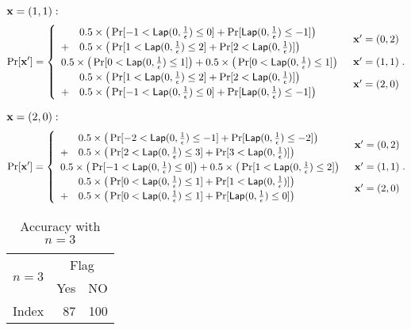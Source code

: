 \documentclass{article}
\begin{document}
\noindent $\textbf{x} = (1,1):$
\[
\Pr[\textbf{x}']
= \begin{cases}
\begin{array}{ll}
 	& 0.5 \times 
 	\big(
 	\Pr[	-1	< \mathsf{Lap}(0, \frac{1}{\epsilon})	\leq	0] 
 	+ 
 	\Pr[	\mathsf{Lap}(0, \frac{1}{\epsilon})			\leq	-1] 
 	\big) \\
 	+ 	
 	& 0.5 \times 
 	\big(
 	\Pr[	1	< \mathsf{Lap}(0, \frac{1}{\epsilon})	\leq	2] 
 	+ 
 	\Pr[	2 	< \mathsf{Lap}(0, \frac{1}{\epsilon})] 
 	\big) 
\end{array} 
	& \textbf{x}' = (0, 2)\\
\begin{array}{ll}
 	0.5 \times 
 	\big(
 	\Pr[	0	< \mathsf{Lap}(0, \frac{1}{\epsilon})	\leq	1] 
 	\big)
 	+ 	
 	0.5 \times 
 	\big(
 	\Pr[	0	< \mathsf{Lap}(0, \frac{1}{\epsilon})	\leq	1] 
 	\big) 
\end{array}  
	& \textbf{x}' = (1, 1)\\
\begin{array}{ll}
 	& 0.5 \times 
 	\big(
 	\Pr[	1	<	\mathsf{Lap}(0, \frac{1}{\epsilon})	\leq	2] 
 	+ 
 	\Pr[	2	<	\mathsf{Lap}(0, \frac{1}{\epsilon})]
 	\big) \\
 	+ 	
 	& 0.5 \times 
 	\big(
 	\Pr[	-1	< \mathsf{Lap}(0, \frac{1}{\epsilon})	\leq	0] 
 	+ 
 	\Pr[	\mathsf{Lap}(0, \frac{1}{\epsilon})			\leq	-1] 
 	\big) 
\end{array}  
& \textbf{x}' = (2, 0)
\end{cases}.
\]

\noindent $\textbf{x} = (2,0):$
\[
\Pr[\textbf{x}']
= \begin{cases}
\begin{array}{ll}
 	& 0.5 \times 
 	\big(
 	\Pr[	-2	< \mathsf{Lap}(0, \frac{1}{\epsilon})	\leq	-1] 
 	+ 
 	\Pr[	\mathsf{Lap}(0, \frac{1}{\epsilon})			\leq 	-2] 
 	\big) \\
 	+ 	
 	& 0.5 \times 
 	\big(
 	\Pr[	2	< \mathsf{Lap}(0, \frac{1}{\epsilon})	\leq	3] 
 	+ 
 	\Pr[	3	< \mathsf{Lap}(0, \frac{1}{\epsilon})] 
 	\big) 
\end{array} 
	& \textbf{x}' = (0, 2)\\
\begin{array}{ll}
 	0.5 \times 
 	\big(
 	\Pr[	-1	< \mathsf{Lap}(0, \frac{1}{\epsilon})	\leq	0] 
 	\big)
 	+ 	
 	0.5 \times 
 	\big(
 	\Pr[	1	< \mathsf{Lap}(0, \frac{1}{\epsilon})	\leq	2] 
 	\big) 
\end{array}  
	& \textbf{x}' = (1, 1)\\
\begin{array}{ll}
 	& 0.5 \times 
 	\big(
 	\Pr[	0	<	\mathsf{Lap}(0, \frac{1}{\epsilon})	\leq	1] 
 	+ 
 	\Pr[	1	<	\mathsf{Lap}(0, \frac{1}{\epsilon})]
 	\big) \\
 	+ 	
 	& 0.5 \times 
 	\big(
 	\Pr[	0	< \mathsf{Lap}(0, \frac{1}{\epsilon})	\leq	1] 
 	+ 
 	\Pr[	\mathsf{Lap}(0, \frac{1}{\epsilon})			\leq	0] 
 	\big) 
\end{array}  
& \textbf{x}' = (2, 0)
\end{cases}.
\]


\begin{table}[htbp]
	\centering
	\caption{Accuracy with $n = 3$}
\begin{tabular}{|c|r|r|}
	\hline

	\multirow{2}{*}{$n = 3$} & \multicolumn{2}{c|}{Flag}  \\ \cline{2-3}
	                      &  Yes  &   NO \\  \hline
	Index                 & 87    &  100 \\  \hline
\end{tabular}
\end{table}
\end{document}
